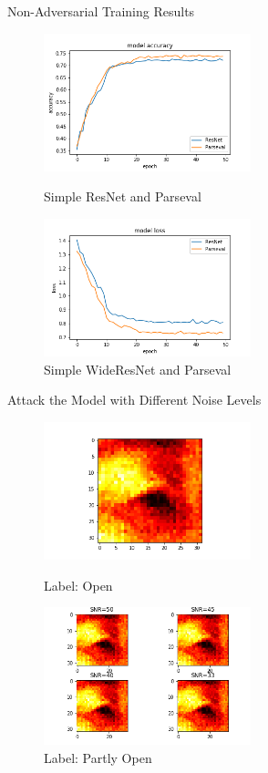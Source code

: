 \documentclass{beamer}		%
\begin{document}
\begin{frame}{Non-Adversarial Training Results}
\begin{figure}[!htb]

   \begin{minipage}{0.48\textwidth}
     \centering
     \includegraphics[height=4cm,width=.9\linewidth]{NonAdversarialTraining_accuracy.png}
     \caption{Simple ResNet and Parseval}
   \end{minipage}\hfill
   \begin{minipage}{0.48\textwidth}
     \centering
     \includegraphics[height=4cm,width=.9\linewidth]{NonAdversarialTraining_loss.png}
     \caption{Simple WideResNet and Parseval}
   \end{minipage}
\end{figure}
\end{frame}
\begin{frame}{Attack the Model with Different Noise Levels}
   \begin{figure}[!htb]
    
   \begin{minipage}{0.48\textwidth}
     \centering
     \includegraphics[height=4cm,width=0.9\linewidth]{OriginalImage.png}
      \caption{Label: Open}
   \end{minipage}\hfill
   \begin{minipage}{0.48\textwidth}
     \centering
     \includegraphics[height=4cm,width=0.9\linewidth]{PertubatedImagesforDifferentSNR.png}
     \caption{Label: Partly Open}
   \end{minipage}
\end{figure}
\end{frame}
\end{document}
